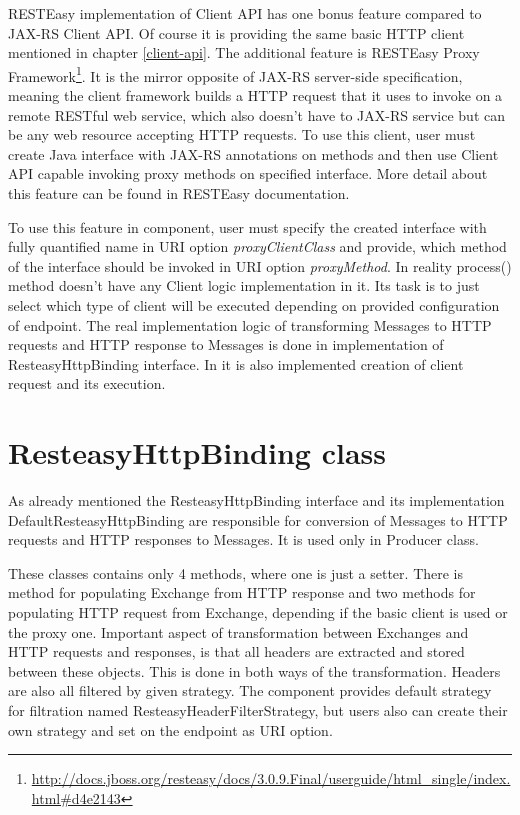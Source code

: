 \documentclass[12pt,final,oneside]{fithesis2}
\begin{document}
RESTEasy implementation of Client API has one bonus feature compared to JAX-RS Client API. Of course it is providing the same basic HTTP client mentioned in chapter \ref{client-api}. The additional feature is RESTEasy Proxy Framework\footnote{\url{http://docs.jboss.org/resteasy/docs/3.0.9.Final/userguide/html_single/index.html\#d4e2143}}. It is the mirror opposite of JAX-RS server-side specification, meaning the client framework builds a HTTP request that it uses to invoke on a remote RESTful web service, which also doesn't have to JAX-RS service but can be any web resource accepting HTTP requests. To use this client, user must create Java interface with JAX-RS annotations on methods and then use Client API capable invoking proxy methods on specified interface\cite{resteasy-doc}. More detail about this feature can be found in RESTEasy documentation. 

To use this feature in component, user must specify the created interface with fully quantified name in URI option \textit{proxyClientClass} and provide, which method of the interface should be invoked in URI option \textit{proxyMethod}. In reality process() method doesn't have any Client logic implementation in it. Its task is to just select which type of client will be executed depending on provided configuration of endpoint. The real implementation logic of transforming Messages to HTTP requests and HTTP response to Messages is done in implementation of ResteasyHttpBinding interface. In it is also implemented creation of client request and its execution.


\section{ResteasyHttpBinding class}
As already mentioned the ResteasyHttpBinding interface and its implementation DefaultResteasyHttpBinding are responsible for conversion of Messages to HTTP requests and HTTP responses to Messages. It is used only in Producer class. 

These classes contains only 4 methods, where one is just a setter. There is method for populating Exchange from HTTP response and two methods for populating HTTP request from Exchange, depending if the basic client is used or the proxy one. Important aspect of transformation between Exchanges and HTTP requests and responses, is that all headers are extracted and stored between these objects. This is done in both ways of the transformation. Headers are also all filtered by given strategy. The component provides default strategy for filtration named ResteasyHeaderFilterStrategy, but users also can create their own strategy and set on the endpoint as URI option.
\end{document}
